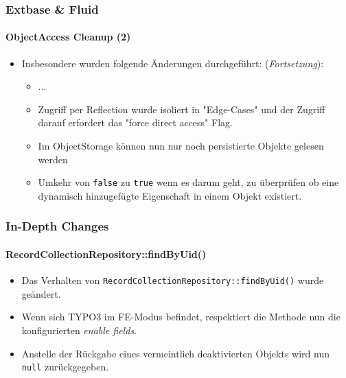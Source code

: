 \begin{frame}[fragile]
	\frametitle{Extbase \& Fluid}
	\framesubtitle{ObjectAccess Cleanup (2)}

	\begin{itemize}

		\item Insbesondere wurden folgende Änderungen durchgeführt: (\textit{Fortsetzung}):

			\begin{itemize}
				\item ...
				\item Zugriff per Reflection wurde isoliert in "Edge-Cases" und der Zugriff darauf erfordert das  "force direct access" Flag.
				\item Im ObjectStorage können nun nur noch persistierte Objekte gelesen werden
				\item Umkehr von \texttt{false} zu \texttt{true} wenn es darum geht, zu überprüfen ob eine dynamisch hinzugefügte Eigenschaft in einem Objekt existiert.
			\end{itemize}

	\end{itemize}

\end{frame}


\begin{frame}[fragile]
	\frametitle{In-Depth Changes}
	\framesubtitle{RecordCollectionRepository::findByUid()}

	\begin{itemize}
		\item Das Verhalten von \texttt{RecordCollectionRepository::findByUid()} wurde geändert.
		\item Wenn sich TYPO3 im FE-Modus befindet, respektiert die Methode nun die konfigurierten  \textit{enable fields}.
		\item Anstelle der Rückgabe eines vermeintlich deaktivierten Objekts wird nun \texttt{null} zurückgegeben.

	\end{itemize}

\end{frame}

